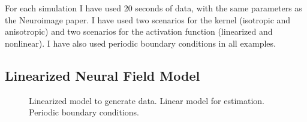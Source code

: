 \documentclass[conference,onecolumn]{IEEEtran}
\begin{document}
For each simulation I have used 20 seconds of data, with the same parameters as the Neuroimage paper.
I have used two scenarios for the kernel (isotropic and anisotropic) and two scenarios for the activation function (linearized and nonlinear). I have also used periodic boundary conditions in all examples.

\subsection{Linearized Neural Field Model}

\begin{figure}[htbp]
	\centering
	\caption{Linearized model to generate data. Linear model for estimation. Periodic boundary conditions.}
	\label{fig:label}
\end{figure}
\end{document}
